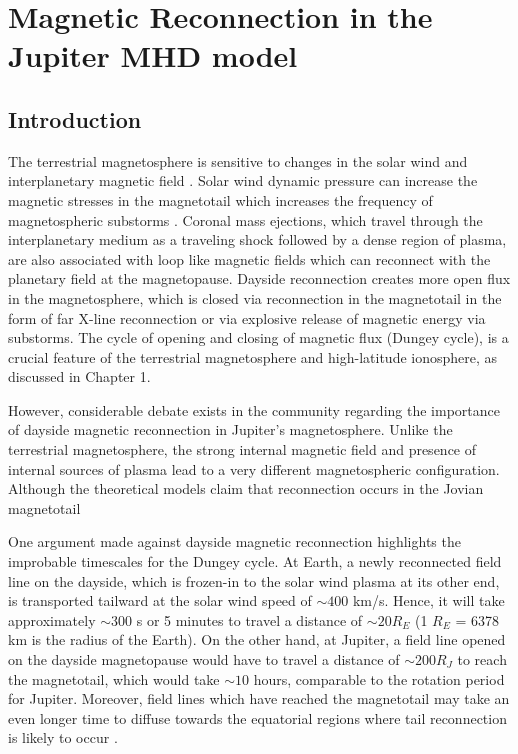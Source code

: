 \chapter{Magnetic Reconnection in the Jupiter MHD model}

\section{Introduction}
The terrestrial magnetosphere is sensitive to changes in the solar wind and interplanetary magnetic field \cite{Sibeck1991SolarMotion,McPherron2008ResponseWind}. Solar wind dynamic pressure can increase the magnetic stresses in the magnetotail which increases the frequency of magnetospheric substorms \cite{Kokubun1977TriggeringDiscontinuities,Newell2011SolarTriggering,Newell2016SubstormSpeed}. Coronal mass ejections, which travel through the interplanetary medium as a traveling shock followed by a dense region of plasma, are also associated with loop like magnetic fields which can reconnect with the planetary field at the magnetopause. Dayside reconnection creates more open flux in the magnetosphere, which is closed via reconnection in the magnetotail in the form of far X-line reconnection or via explosive release of magnetic energy via substorms. The cycle of opening and closing of magnetic flux (Dungey cycle), is a crucial feature of the terrestrial magnetosphere and high-latitude ionosphere, as discussed in Chapter 1.

However, considerable debate exists in the community regarding the importance of dayside magnetic reconnection in Jupiter's magnetosphere. Unlike the terrestrial magnetosphere, the strong internal magnetic field and presence of internal sources of plasma lead to a very different magnetospheric configuration. Although the theoretical models claim that reconnection occurs in the Jovian magnetotail

One argument made against dayside magnetic reconnection highlights the improbable timescales for the Dungey cycle. At Earth, a newly reconnected field line on the dayside, which is frozen-in to the solar wind plasma at its other end, is transported tailward at the solar wind speed of $\sim400$ km/s. Hence, it will take approximately $\sim$300 s or 5 minutes to travel a distance of $\sim20 R_E$ (1 $R_E$ = 6378 km is the radius of the Earth). On the other hand, at Jupiter, a field line opened on the dayside magnetopause would have to travel a distance of $\sim200 R_J$ to reach the magnetotail, which would take  $\sim10$ hours, comparable to the rotation period for Jupiter. Moreover, field lines which have reached the magnetotail may take an even longer time to diffuse towards the equatorial regions where tail reconnection is likely to occur \cite{McComas2007}. 

